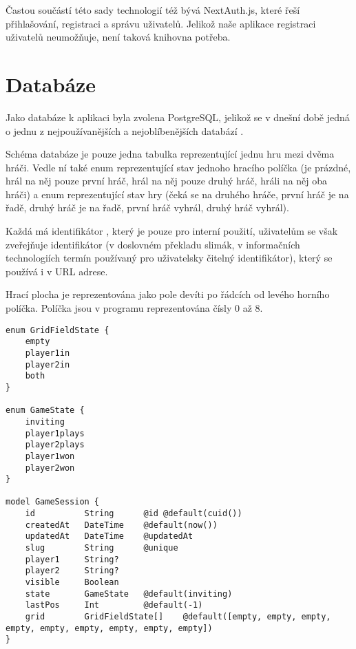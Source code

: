 Častou součástí této sady technologií též bývá NextAuth.js, které řeší
přihlašování, registraci a správu uživatelů. Jelikož naše aplikace registraci
uživatelů neumožňuje, není taková knihovna potřeba.

\section{Databáze}

Jako databáze k aplikaci byla zvolena PostgreSQL, jelikož se v dnešní době
jedná o jednu z nejpoužívanějších a nejoblíbenějších databází \cite{stackoverflow23}.

Schéma databáze je pouze jedna tabulka  reprezentující jednu hru
mezi dvěma hráči. Vedle ní také enum  reprezentující stav
jednoho hracího políčka (je prázdné, hrál na něj pouze první hráč, hrál na něj
pouze druhý hráč, hráli na něj oba hráči) a enum  reprezentující
stav hry (čeká se na druhého hráče, první hráč je na řadě, druhý hráč je na
řadě, první hráč vyhrál, druhý hráč vyhrál).

Každá  má identifikátor , který je pouze pro interní
použití, uživatelům se však zveřejňuje identifikátor  (v doslovném
překladu slimák, v informačních technologiích termín používaný pro uživatelsky
čitelný identifikátor), který se používá i v URL adrese.\label{par:game-id}

\label{par:game-grid}
Hrací plocha je reprezentována jako pole devíti  po řádcích
od levého horního políčka. Políčka jsou v programu reprezentována čísly 0 až 8.

\begin{lstlisting}[language=Prisma,caption={Schéma databáze},label={fig:db-schema}]
enum GridFieldState {
    empty
    player1in
    player2in
    both
}

enum GameState {
    inviting
    player1plays
    player2plays
    player1won
    player2won
}

model GameSession {
    id          String      @id @default(cuid())
    createdAt   DateTime    @default(now())
    updatedAt   DateTime    @updatedAt
    slug        String      @unique
    player1     String?
    player2     String?
    visible     Boolean
    state       GameState   @default(inviting)
    lastPos     Int         @default(-1)
    grid        GridFieldState[]    @default([empty, empty, empty, empty, empty, empty, empty, empty, empty])
}
\end{lstlisting}

